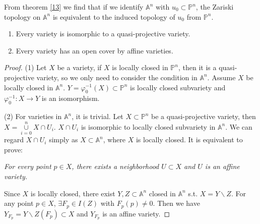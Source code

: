 \begin{remark}
	From theorem \ref{13} we find that if we identify $ \mathbb{A}^n $ with $ u_0\subset \mathbb{P}^n $, the Zariski topology on $ \mathbb{A}^n $ is equivalent to the induced topology of $ u_0 $ from $ \mathbb{P}^n $.
\end{remark}
\begin{corollary}{}
  \noindent
	\begin{enumerate}
		\item Every variety is isomorphic to a quasi-projective variety.
		\item Every variety has an open cover by affine varieties.
	\end{enumerate}
\end{corollary}
\begin{proof}
	(1) Let $ X $ be a variety, if $ X $ is locally closed in $ \mathbb{P}^n $,
	then it is  a quasi-projective variety, so we only need to consider the condition in $ \mathbb{A}^n $. Assume $ X $ be locally closed in $ \mathbb{A}^n $. $ Y=\varphi ^{-1}_0 (X) \subset \mathbb{P}^n$ is locally closed subvariety and $ \varphi^{-1}_0 :X\to Y $ is an isomorphism.

	(2) For varieties in $ \mathbb{A}^n $, it is trivial. Let $ X\subset \mathbb{P}^n $ be a quasi-projective variety, then $ X=\mathop{\cup}\limits_{i=0}^{n}X\cap U_i $. $ X\cap U_i $ is isomorphic to locally closed subvariety in $ \mathbb{A}^n $. We can regard $ X\cap U_i $ simply as $ X \subset \mathbb{A}^n$, where $ X $ is locally closed. It is equivalent to prove:
	\begin{center}
		\itshape
		For every point $ p\in X $, there exists a neighborhood $ U\subset X $ and $ U $ is an affine variety.
	\end{center}
	Since $ X $ is locally closed, there exist $ Y,Z\subset \mathbb{A}^n $ closed in $ \mathbb{A}^n $ s.t. $ X=Y\backslash Z $. For any point $ p\in X $, $ \exists F_p\in I(Z) $ with $ F_p(p)\neq 0 $. Then we have $ Y_{F_p}=Y\backslash Z(F_p)\subset X $ and $ Y_{F_p} $ is an affine variety.
\end{proof}
